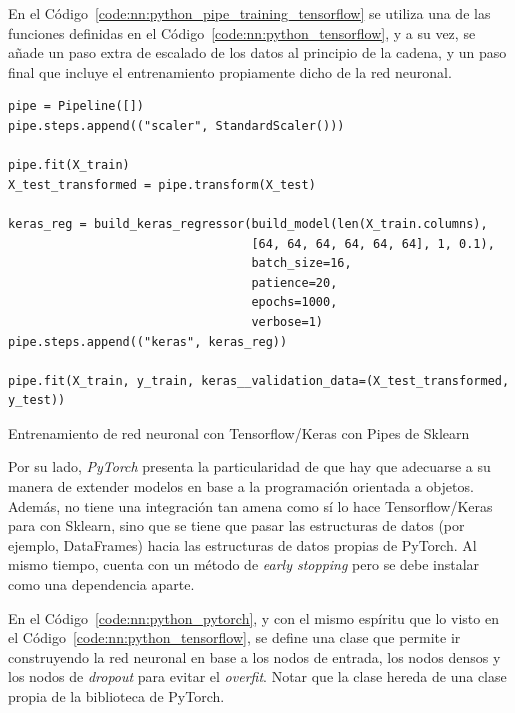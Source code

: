\documentclass[11pt]{article}
\newcommand{\english}[1]{\textit{#1}}
\begin{document}
En el Código~\ref{code:nn:python_pipe_training_tensorflow} se utiliza una de las funciones definidas en el Código~\ref{code:nn:python_tensorflow}, y a su vez, se añade un paso extra de escalado de los datos al principio de la cadena, y un paso final que incluye el entrenamiento propiamente dicho de la red neuronal. 

\begin{listing}
\begin{verbatim}
pipe = Pipeline([])
pipe.steps.append(("scaler", StandardScaler()))

pipe.fit(X_train)
X_test_transformed = pipe.transform(X_test)

keras_reg = build_keras_regressor(build_model(len(X_train.columns),
                                  [64, 64, 64, 64, 64, 64], 1, 0.1),
                                  batch_size=16,
                                  patience=20,
                                  epochs=1000,
                                  verbose=1)
pipe.steps.append(("keras", keras_reg))

pipe.fit(X_train, y_train, keras__validation_data=(X_test_transformed, y_test))
\end{verbatim}
\caption{Entrenamiento de red neuronal con Tensorflow/Keras con Pipes de Sklearn}
\label{code:nn:python_pipe_training_tensorflow}
\end{listing}

Por su lado, \english{PyTorch} presenta la particularidad de que hay que adecuarse a su manera de extender modelos en base a la programación orientada a objetos. Además, no tiene una integración tan amena como sí lo hace Tensorflow/Keras para con Sklearn, sino que se tiene que pasar las estructuras de datos (por ejemplo, DataFrames) hacia las estructuras de datos propias de PyTorch. Al mismo tiempo, cuenta con un método de \english{early stopping} pero se debe instalar como una dependencia aparte.

En el Código~\ref{code:nn:python_pytorch}, y con el mismo espíritu que lo visto en el Código~\ref{code:nn:python_tensorflow}, se define una clase que permite ir construyendo la red neuronal en base a los nodos de entrada, los nodos densos y los nodos de \english{dropout} para evitar el \english{overfit}. Notar que la clase hereda de una clase propia de la biblioteca de PyTorch.
\end{document}
